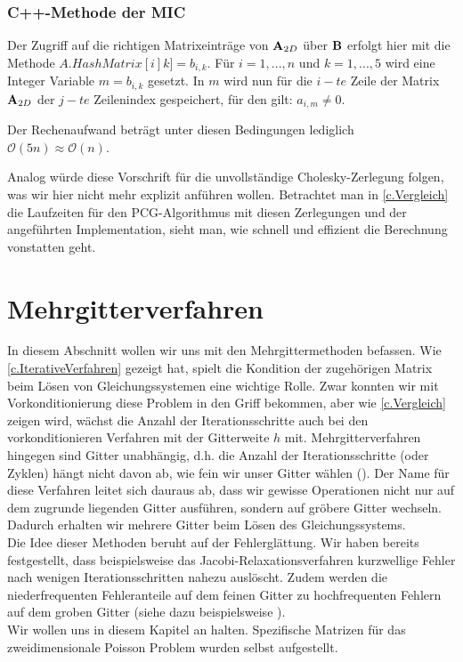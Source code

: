 \subsection{C++-Methode der MIC}\label{s.MIC}

Der Zugriff auf die richtigen Matrixeinträge von ${\textbf{A}}_{2D}$ über ${\textbf{B}}$ erfolgt hier mit die Methode $A.HashMatrix[i]k] = b_{i,k}$. Für $i = 1,...,n$ und $k = 1,...,5$ wird eine Integer Variable $m = b_{i,k}$ gesetzt. In $m$ wird nun für die $i - te$ Zeile der Matrix ${\textbf{A}}_{2D}$ der $j - te$ Zeilenindex gespeichert, für den gilt: $a_{i,m} \ne 0$.

Der Rechenaufwand beträgt unter diesen Bedingungen lediglich $\mathcal{O}(5n) \approx \mathcal{O}(n)$.

Analog würde diese Vorschrift für die unvollständige Cholesky-Zerlegung folgen, was wir hier nicht mehr explizit anführen wollen. Betrachtet man in \autoref{c.Vergleich} die Laufzeiten für den PCG-Algorithmus mit diesen Zerlegungen und der angeführten Implementation, sieht man, wie schnell und effizient die Berechnung vonstatten geht.

\chapter{Mehrgitterverfahren}\label{c.Mehrgitterverfahren}

In diesem Abschnitt wollen wir uns mit den Mehrgittermethoden befassen. Wie \autoref{c.IterativeVerfahren} gezeigt hat, spielt die Kondition der zugehörigen Matrix beim Lösen von Gleichungssystemen eine wichtige Rolle. Zwar konnten wir mit Vorkonditionierung diese Problem in den Griff bekommen, aber wie \autoref{c.Vergleich} zeigen wird, wächst die Anzahl der Iterationsschritte auch bei den vorkonditionieren Verfahren mit der Gitterweite $h$ mit. Mehrgitterverfahren hingegen sind Gitter unabhängig, d.h. die Anzahl der Iterationsschritte (oder Zyklen) hängt nicht davon ab, wie fein wir unser Gitter wählen (\cite{SAAD6}). Der Name für diese Verfahren leitet sich dauraus ab, dass wir gewisse Operationen nicht nur auf dem zugrunde liegenden Gitter ausführen, sondern auf gröbere Gitter wechseln. Dadurch erhalten wir mehrere Gitter beim Lösen des Gleichungssystems.\\
Die Idee dieser Methoden beruht auf der Fehlerglättung. Wir haben bereits festgestellt, dass beispielsweise das Jacobi-Relaxationsverfahren kurzwellige Fehler nach wenigen Iterationsschritten nahezu auslöscht. Zudem werden die niederfrequenten Fehleranteile auf dem feinen Gitter zu hochfrequenten Fehlern auf dem groben Gitter (siehe dazu beispielsweise \cite{STR}).\\
Wir wollen uns in diesem Kapitel an \cite{SAAD7} halten. Spezifische Matrizen für das zweidimensionale Poisson Problem wurden selbst aufgestellt.

